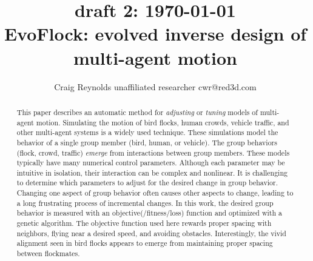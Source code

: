 \documentclass[letterpaper]{article}
\begin{document}
\title{{\tiny draft 2: \today}\\EvoFlock: evolved inverse design of multi-agent motion}

\author{Craig Reynolds\authorcr
    unaffiliated researcher\authorcr 
    cwr@red3d.com}


\captionsetup{hypcap=false}


\date{}

\maketitle



\begin{abstract}
    This paper describes an automatic method for \textit{adjusting} or \textit{tuning} models of multi-agent motion. Simulating the motion of bird flocks, human crowds, vehicle traffic, and other multi-agent systems is a widely used technique. These simulations model the behavior of a single group member (bird, human, or vehicle). The group behaviors (flock, crowd, traffic) \textit{emerge} from interactions between group members. These models typically have many numerical control parameters. Although each parameter may be intuitive in isolation, their interaction can be complex and nonlinear. It is challenging to determine which parameters to adjust for the desired change in group behavior. Changing one aspect of group behavior often causes other aspects to change, leading to a long frustrating process of incremental changes. In this work, the desired group behavior is measured with an objective(/fitness/loss) function and optimized with a genetic algorithm. The objective function used here rewards proper spacing with neighbors, flying near a desired speed, and avoiding obstacles. Interestingly, the vivid alignment seen in bird flocks appears to emerge from maintaining proper spacing between flockmates.
\end{abstract}
\end{document}
